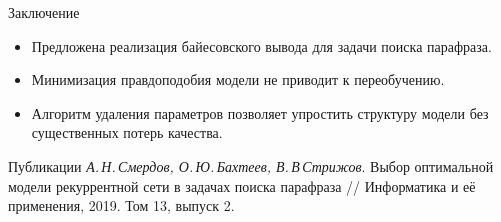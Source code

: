 \documentclass{beamer}
\begin{document}
\begin{frame}{Заключение}

\begin{itemize}
\item Предложена реализация байесовского вывода для задачи поиска парафраза.
\item Минимизация правдоподобия модели не приводит к переобучению.
\item Алгоритм удаления параметров позволяет упростить структуру модели без существенных потерь качества.
\end{itemize}

\begin{block}{Публикации}
\textit{А.\,Н.\,Смердов, О.\,Ю.\,Бахтеев, В.\,В\,Стрижов}. Выбор оптимальной модели рекуррентной сети в задачах поиска парафраза // Информатика и её применения, 2019. Том 13, выпуск 2.
\end{block}


\end{frame}
\end{document}
